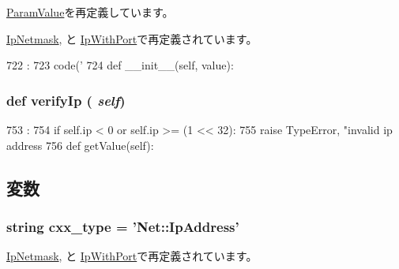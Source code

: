 \hyperlink{classm5_1_1params_1_1ParamValue_ab3dbcf5716623eac67a8ccc074fa7e13}{ParamValue}を再定義しています。

\hyperlink{classm5_1_1params_1_1IpNetmask_ab3dbcf5716623eac67a8ccc074fa7e13}{IpNetmask}, と \hyperlink{classm5_1_1params_1_1IpWithPort_ab3dbcf5716623eac67a8ccc074fa7e13}{IpWithPort}で再定義されています。


\begin{DoxyCode}
722                                 :
723         code('%
724 
    def __init__(self, value):
\end{DoxyCode}
\hypertarget{classm5_1_1params_1_1IpAddress_a11d6a8aa738696081239460999960001}{
\subsubsection[{verifyIp}]{\setlength{\rightskip}{0pt plus 5cm}def verifyIp ( {\em self})}}
\label{classm5_1_1params_1_1IpAddress_a11d6a8aa738696081239460999960001}



\begin{DoxyCode}
753                       :
754         if self.ip < 0 or self.ip >= (1 << 32):
755             raise TypeError, "invalid ip address %
756 
    def getValue(self):
\end{DoxyCode}


\subsection{変数}
\hypertarget{classm5_1_1params_1_1IpAddress_a2f1553ebb79374a68b36fdd6d8d82fc3}{
\subsubsection[{cxx\_\-type}]{\setlength{\rightskip}{0pt plus 5cm}string {\bf cxx\_\-type} = '{\bf Net::IpAddress}'}}
\label{classm5_1_1params_1_1IpAddress_a2f1553ebb79374a68b36fdd6d8d82fc3}


\hyperlink{classm5_1_1params_1_1IpNetmask_a2f1553ebb79374a68b36fdd6d8d82fc3}{IpNetmask}, と \hyperlink{classm5_1_1params_1_1IpWithPort_a2f1553ebb79374a68b36fdd6d8d82fc3}{IpWithPort}で再定義されています。\hypertarget{classm5_1_1params_1_1IpAddress_afd65cf072a93c93ad52b9f25b341e10b}{
\subsubsection[{ip}]{}}
\label{classm5_1_1params_1_1IpAddress_afd65cf072a93c93ad52b9f25b341e10b}


